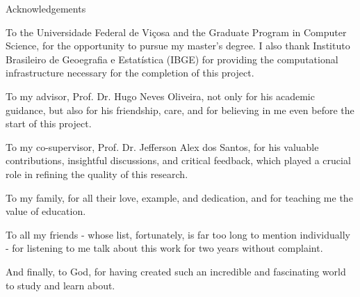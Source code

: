 \huge
\begin{center}
{\selectfont Acknowledgements}
\end{center}
\vspace{0.8cm}
\normalsize

To the Universidade Federal de Viçosa and the Graduate Program in Computer Science, for the opportunity to pursue my master's degree. I also thank Instituto Brasileiro de Geoegrafia e Estatística (IBGE) for providing the computational infrastructure necessary for the completion of this project.
 
To my advisor, Prof. Dr. Hugo Neves Oliveira, not only for his academic guidance, but also for his friendship, care, and for believing in me even before the start of this project.

To my co-supervisor, Prof. Dr. Jefferson Alex dos Santos, for his valuable contributions, insightful discussions, and critical feedback, which played a crucial role in refining the quality of this research.

To my family, for all their love, example, and dedication, and for teaching me the value of education.

To all my friends - whose list, fortunately, is far too long to mention individually - for listening to me talk about this work for two years without complaint.    
 
And finally, to God, for having created such an incredible and fascinating world to study and learn about.

\cleardoublepage